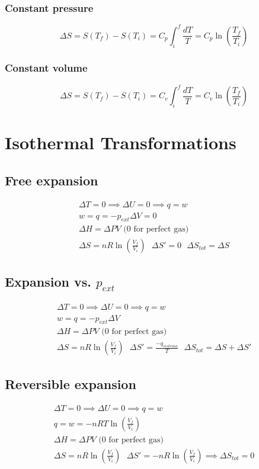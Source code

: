 \documentclass[a4paper]{report}
\begin{document}
\begin{multicols}{2}
      \subsubsection{Constant pressure}
        \[
          \Delta S = S(T_{f}) - S(T_{i}) = C_{p}\int_{i}^{f} \frac{dT}{T} = C_{p}\ln \left( \frac{T_{f}}{T_{i} }  \right)  
        \] 
      \subsubsection{Constant volume} 
        \[
          \Delta S = S(T_{f}) - S(T_{i}) = C_{v}\int_{i}^{f} \frac{dT}{T} = C_{v}\ln \left( \frac{T_{f}}{T_{i} }  \right)  
        \] 
      \section{Isothermal Transformations} 
        \subsection{Free expansion}
          \begin{gather*}
            \Delta T = 0 \implies \Delta U = 0 \implies q = w\\
            w = q = - p_{ext} \Delta V = 0\\
            \Delta H = \Delta PV \text{ (0 for perfect gas)}\\
            \Delta S = nR\ln (\frac{V_f}{V_i}) ~ ~ ~\Delta S' = 0 ~ ~ ~ \Delta S_{tot} = \Delta S
          \end{gather*}

        \subsection{Expansion vs. $p_{ext}$}
          \begin{gather*}
            \Delta T = 0 \implies \Delta U = 0 \implies q = w\\
            w = q = -p_{ext} \Delta V \\
            \Delta H = \Delta PV \text{ (0 for perfect gas)}\\
            \Delta S = nR\ln (\frac{V_f}{V_i}) ~ ~ ~\Delta S' = \frac{-q_{sistema}}{T} ~ ~ ~ \Delta S_{tot} = \Delta S + \Delta S'
          \end{gather*}

        \subsection{Reversible expansion}
          \begin{gather*}
            \Delta T = 0 \implies \Delta U = 0 \implies q = w\\
            q = w = -nRT\ln (\frac{V_f}{V_i})\\
            \Delta H = \Delta PV\text{ (0 for perfect gas)}\\
            \Delta S = nR \ln (\frac{V_f}{V_i}) ~ ~ ~\Delta S' = - nR\ln (\frac{V_f}{V_i}) \implies \Delta S_{tot} = 0
          \end{gather*}


\end{multicols}
\end{document}
